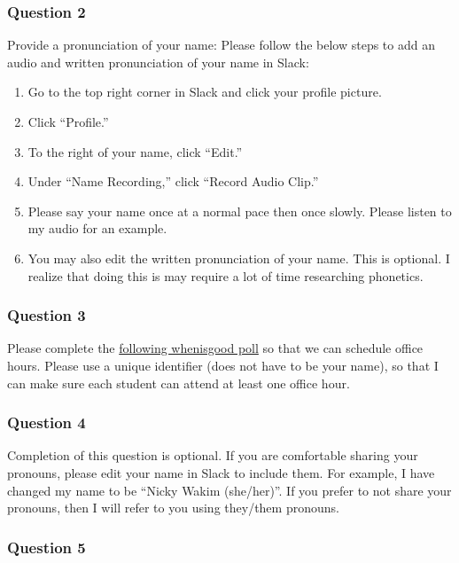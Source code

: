 \documentclass[
  letterpaper,
  DIV=11,
  numbers=noendperiod]{scrartcl}
\providecommand{\tightlist}{%
  \setlength{\itemsep}{0pt}\setlength{\parskip}{0pt}}\usepackage{longtable,booktabs,array}
\begin{document}
\hypertarget{question-2}{%
\subsubsection{Question 2}\label{question-2}}

Provide a pronunciation of your name: Please follow the below steps to
add an audio and written pronunciation of your name in Slack:

\begin{enumerate}
\def\labelenumi{\arabic{enumi}.}
\tightlist
\item
  Go to the top right corner in Slack and click your profile picture.
\item
  Click ``Profile.''
\item
  To the right of your name, click ``Edit.''
\item
  Under ``Name Recording,'' click ``Record Audio Clip.''
\item
  Please say your name once at a normal pace then once slowly. Please
  listen to my audio for an example.
\item
  You may also edit the written pronunciation of your name. This is
  optional. I realize that doing this is may require a lot of time
  researching phonetics.
\end{enumerate}

\hypertarget{question-3}{%
\subsubsection{Question 3}\label{question-3}}

Please complete the \href{https://whenisgood.net/53kgg2b}{following
whenisgood poll} so that we can schedule office hours. Please use a
unique identifier (does not have to be your name), so that I can make
sure each student can attend at least one office hour.

\hypertarget{question-4}{%
\subsubsection{Question 4}\label{question-4}}

Completion of this question is optional. If you are comfortable sharing
your pronouns, please edit your name in Slack to include them. For
example, I have changed my name to be ``Nicky Wakim (she/her)''. If you
prefer to not share your pronouns, then I will refer to you using
they/them pronouns.

\hypertarget{question-5}{%
\subsubsection{Question 5}\label{question-5}}
\end{document}
